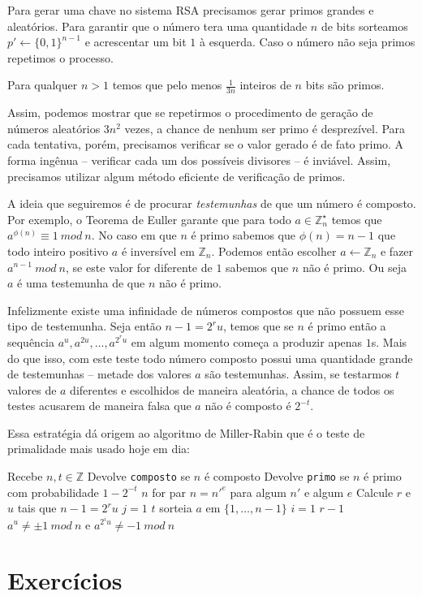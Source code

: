 Para gerar uma chave no sistema RSA precisamos gerar primos grandes e aleatórios.
Para garantir que o número tera uma quantidade $n$ de bits sorteamos $p' \leftarrow \{0,1\}^{n-1}$ e acrescentar um bit $1$ à esquerda.
Caso o número não seja primos repetimos o processo.

\begin{theorem}[Bertrand]
  Para qualquer $n > 1$ temos que pelo menos $\frac{1}{3n}$ inteiros de $n$ bits são primos.
\end{theorem}

Assim, podemos mostrar que se repetirmos o procedimento de geração de números aleatórios $3n^2$ vezes, a chance de nenhum ser primo é desprezível.
Para cada tentativa, porém, precisamos verificar se o valor gerado é de fato primo.
A forma ingênua -- verificar cada um dos possíveis divisores -- é inviável.
Assim, precisamos utilizar algum método eficiente de verificação de primos.

A ideia que seguiremos é de procurar {\em testemunhas} de que um número é composto.
Por exemplo, o Teorema de Euller garante que para todo $a \in \mathbb{Z}_n^\star$ temos que $a^{\phi(n)} \equiv 1\ mod\ n$.
No caso em que $n$ é primo sabemos que $\phi(n) = n - 1$ que todo inteiro positivo $a$ é inversível em $\mathbb{Z}_n$.
Podemos então escolher $a \leftarrow \mathbb{Z}_n$ e fazer $a^{n-1}\ mod\ n$, se este valor for diferente de $1$ sabemos que $n$ não é primo.
Ou seja $a$ é uma testemunha de que $n$ não é primo.

Infelizmente existe uma infinidade de números compostos que não possuem esse tipo de testemunha.
Seja então $n - 1 = 2^ru$, temos que se $n$ é primo então a sequência $a^u, a^{2u}, \dots, a^{2^ru}$ em algum momento começa a produzir apenas $1$s.
Mais do que isso, com este teste todo número composto possui uma quantidade grande de testemunhas -- metade dos valores $a$ são testemunhas.
Assim, se testarmos $t$ valores de $a$ diferentes e escolhidos de maneira aleatória, a chance de todos os testes acusarem de maneira falsa que $a$ não é composto é $2^{-t}$.

Essa estratégia dá origem ao algoritmo de Miller-Rabin \cite{Miller75,Rabin80} que é o teste de primalidade mais usado hoje em dia:

\begin{codebox}
\li \Comment Recebe $n, t \in \mathbb{Z}$
\li \Comment Devolve {\tt composto} se $n$ é composto
\li \Comment Devolve {\tt primo} se $n$ é primo com probabilidade $1 - 2^{-t}$
\li \If $n$ for par
\li   \Then {}
    \End
\li \If $n = n'^e$ para algum $n'$ e algum $e$
\li   \Then {}
    \End
\li  Calcule $r$ e $u$ tais que $n-1 = 2^ru$
\li \For $j = 1$ \To $t$
\li   \Do sorteia $a$ em $\{1, \dots, n-1\}$ 
\li   \For $i = 1$ \To $r-1$
\li     \Do \If $a^u \neq \pm 1\ mod\ n$ e $a^{2^iu} \neq -1\ mod\ n$
\li         \Then {}
            \End
      \End
    \End
\li {}
\end{codebox}

\section{Exercícios}
\label{sec:exercicios}


